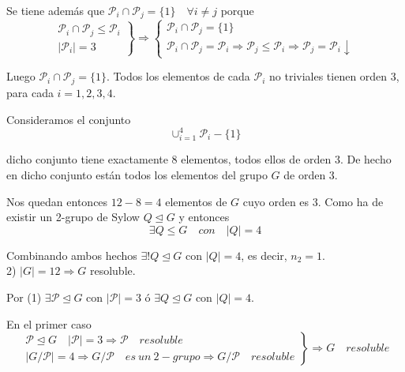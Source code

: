 \documentclass{article}
\begin{document}
Se tiene además que $\mathcal{P}_i\cap \mathcal{P}_j=\{1\}\quad \forall i\neq j$ porque
\begin{equation*}
\left.\begin{array}{c}
\mathcal{P}_i\cap \mathcal{P}_j\leq \mathcal{P}_i\\
|\mathcal{P}_i|=3
\end{array}\right\rbrace \Rightarrow \left\lbrace \begin{array}{c}
\mathcal{P}_i\cap \mathcal{P}_j=\{1\}\\
\mathcal{P}_i\cap \mathcal{P}_j=\mathcal{P}_i\Rightarrow\mathcal{P}_j\leq \mathcal{P}_i\Rightarrow \mathcal{P}_j=\mathcal{P}_i \downarrow
\end{array} \right.
\end{equation*}

Luego $\mathcal{P}_i\cap \mathcal{P}_j=\{1\}$. Todos los elementos de cada $\mathcal{P}_i$ no triviales tienen orden 3, para cada $i=1,2,3,4$. 

Consideramos el conjunto
\begin{equation*}
\cup_{i=1}^4 \mathcal{P}_i-\{1\}
\end{equation*}

dicho conjunto tiene exactamente 8 elementos, todos ellos de orden 3. De hecho en dicho conjunto están todos los elementos del grupo $G$ de orden 3. 

Nos quedan entonces $12-8=4$ elementos de $G$ cuyo orden es 3. Como ha de existir un 2-grupo de Sylow $Q\unlhd G$ y entonces
\begin{equation*}
\exists Q\leq G\quad con\quad |Q|=4
\end{equation*}

Combinando ambos hechos $\exists! Q\unlhd G$ con $|Q|=4$, es decir, $n_2=1$. \\

2) $|G|=12\Rightarrow G$ resoluble.

Por (1) $\exists \mathcal{P}\unlhd G$ con $|\mathcal{P}|=3$ ó $\exists Q\unlhd G$ con $|Q|=4$.

En el primer caso
\begin{equation*}
\left. \begin{array}{c}
\mathcal{P}\unlhd G\quad |\mathcal{P}|=3\Rightarrow \mathcal{P}\quad resoluble \\
|G/\mathcal{P}|=4\Rightarrow G/\mathcal{P}\quad es\:un\:2-grupo \Rightarrow G/\mathcal{P}\quad resoluble
\end{array} \right\rbrace \Rightarrow G\quad resoluble
\end{equation*}
\end{document}
